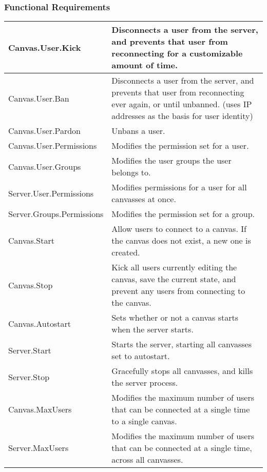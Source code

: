 \documentclass[11pt,oneside,a4paper]{article}
\begin{document}
\subsubsection{Functional Requirements}
\begin{center}
\begin{tabular}{ | p{6cm} | p{6cm} | }
\hline
\tiny{Canvas.User.Kick}			& \tiny{Disconnects a user from the server, and prevents that user from reconnecting for a customizable amount of time.} \\
\hline
\tiny{Canvas.User.Ban}			& \tiny{Disconnects a user from the server, and prevents that user from reconnecting ever again, or until unbanned. (uses IP addresses as the basis for user identity)} \\
\hline
\tiny{Canvas.User.Pardon}		& \tiny{Unbans a user.} \\
\hline
\tiny{Canvas.User.Permissions}		& \tiny{Modifies the permission set for a user.} \\
\hline
\tiny{Canvas.User.Groups}		& \tiny{Modifies the user groups the user belongs to.} \\
\hline
\tiny{Server.User.Permissions}		& \tiny{Modifies permissions for a user for all canvasses at once.} \\
\hline
\tiny{Server.Groups.Permissions}	& \tiny{Modifies the permission set for a group.} \\
\hline
\tiny{Canvas.Start}			& \tiny{Allow users to connect to a canvas. If the canvas does not exist, a new one is created.} \\
\hline
\tiny{Canvas.Stop}			& \tiny{Kick all users currently editing the canvas, save the current state, and prevent any users from connecting to the canvas.} \\
\hline
\tiny{Canvas.Autostart}			& \tiny{Sets whether or not a canvas starts when the server starts.} \\
\hline
\tiny{Server.Start}			& \tiny{Starts the server, starting all canvasses set to autostart.} \\
\hline
\tiny{Server.Stop}			& \tiny{Gracefully stops all canvasses, and kills the server process.} \\
\hline
\tiny{Canvas.MaxUsers}			& \tiny{Modifies the maximum number of users that can be connected at a single time to a single canvas.} \\
\hline
\tiny{Server.MaxUsers}			& \tiny{Modifies the maximum number of users that can be connected at a single time, across all canvasses.} \\
\hline
\end{tabular}
\end{center}
\end{document}
